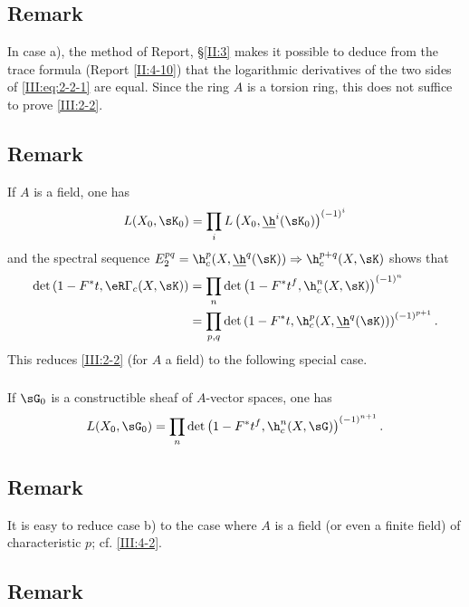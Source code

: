 \documentclass[oneside]{book}
\begin{document}
\subsection{Remark}\label{III:2-3}

In case a), the method of Report, \S\ref{II:3} makes it possible to deduce
from the trace formula (Report \ref{II:4-10}) that the logarithmic derivatives
of the two sides of \eqref{III:eq:2-2-1} are equal. Since the ring $A$ is a
torsion ring, this does not suffice to prove \ref{III:2-2}.






\subsection{Remark}\label{III:2-4}

If $A$ is a field, one has
\[
  L(X_0,\sK_0) = \prod_i L\left(X_0,\underline\h^i(\sK_0)\right)^{(-1)^i}
\]
and the spectral sequence
$E_2^{p q} = \h_c^p(X,\underline\h^q(\sK))\Rightarrow \h_c^{p+q}(X,\sK)$ shows
that
\begin{align*}
  \det\left(1-F^* t, \eR\Gamma_c(X,\sK)\right)
    &= \prod_n \det\left(1-F^* t^f,\h_c^n(X,\sK)\right)^{(-1)^n} \\
    &= \prod_{p,q} \det\left(1-F^* t,\h_c^p(X,\underline\h^q(\sK))\right)^{(-1)^{p+1}} \text{.}
\end{align*}
This reduces \ref{III:2-2} (for $A$ a field) to the following special case.


\subsubsection{}\label{III:2-4-1}

If $\sG_0$ is a constructible sheaf of $A$-vector spaces, one has
\[
  L(X_0,\sG_0) = \prod_n \det\left(1-F^* t^f,\h_c^n(X,\sG)\right)^{(-1)^{n+1}} \text{.}
\]






\subsection{Remark}\label{III:2-5}

It is easy to reduce case b) to the case where $A$ is a field (or even a
finite field) of characteristic $p$; cf. \ref{III:4-2}.






\subsection{Remark}\label{III:2-6}
\end{document}
